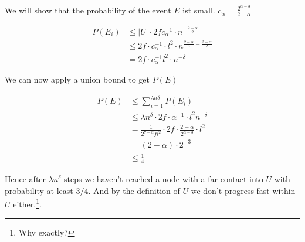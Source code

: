 \begin{pr}
We will show that the probability of the event $E$ ist small. $c_\alpha = \frac{2^{\alpha-3}}{2-\alpha}$

\begin{align*}
P(E_i) &\leq |U| \cdot 2fc_\alpha^{-1} \cdot n^{-\frac{2-\alpha}{2}}\\
	&\leq 2f\cdot c_\alpha^{-1} \cdot l^2 \cdot n^{\frac{2-\alpha}{3} -\frac{2-\alpha}{2}}\\
	&=2f\cdot c_\alpha ^{-1} l^2 \cdot n^{-\delta}
\end{align*}

We can now apply a union bound to get $P(E)$

\begin{align*}
P(E) &\leq\sum_{i=1}^{\lambda n\delta} P(E_i)\\
	&\leq  \lambda n^\delta \cdot 2f\cdot \alpha^{-1} \cdot l^2 n^{-\delta}\\
	&= \frac{1}{2^{7-\alpha} fl^2} \cdot 2f\cdot \frac{2-\alpha}{2^{\alpha-3}} \cdot l^2\\
	&=(2-\alpha)\cdot 2^{-3}\\
	&\leq \frac{1}{4}
\end{align*}

Hence after $\lambda n^\delta$ steps we haven't reached a node with a far contact into $U$ with probability at least $3/4$. And by the definition of $U$ we don't progress fast within $U$ either.\footnote{Why exactly?}.
\end{pr}
